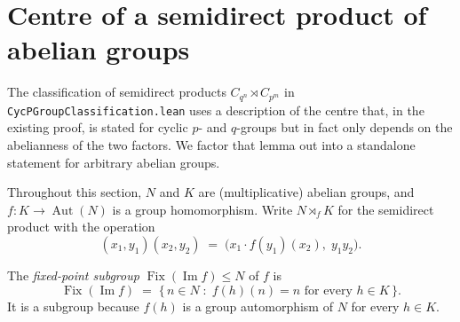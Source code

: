 


\section{Centre of a semidirect product of abelian groups}

The classification of semidirect products $C_{q^n}\rtimes C_{p^m}$ in
\texttt{CycPGroupClassification.lean} uses a description of the centre that, in
the existing proof, is stated for cyclic $p$- and $q$-groups but in fact only
depends on the abelianness of the two factors. We factor that lemma out into a
standalone statement for arbitrary abelian groups.

Throughout this section, $N$ and $K$ are (multiplicative) abelian groups, and
$f : K \to \operatorname{Aut}(N)$ is a group homomorphism. Write $N\rtimes_f K$
for the semidirect product with the operation
\[
  (x_1, y_1)(x_2, y_2) \;=\; \bigl(x_1\cdot f(y_1)(x_2),\; y_1 y_2\bigr).
\]

\begin{definition}\label{def:fixedPointsSubgroup}
\leanok
The \emph{fixed-point subgroup} $\operatorname{Fix}(\operatorname{Im} f)\le N$
of $f$ is
\[
  \operatorname{Fix}(\operatorname{Im} f)
  \;=\; \{\, n \in N \;:\; f(h)(n) = n \text{ for every } h \in K \,\}.
\]
It is a subgroup because $f(h)$ is a group automorphism of $N$ for every
$h \in K$.
\end{definition}

